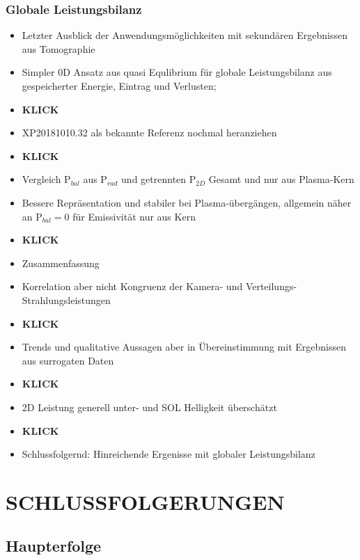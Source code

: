 \documentclass[11pt,a4paper]{article}
\begin{document}
\subsubsection*{Globale Leistungsbilanz}

\begin{itemize}
\item Letzter Ausblick der Anwendungsmöglichkeiten mit sekundären Ergebnissen aus Tomographie
\item Simpler 0D Ansatz aus quasi Equlibrium für globale Leistungsbilanz aus gespeicherter Energie, Eintrag und Verlusten;
\item \textbf{KLICK}
\item XP20181010.32 als bekannte Referenz nochmal heranziehen
\item \textbf{KLICK}
\item Vergleich P$_{bal}$ aus P$_{rad}$ und getrennten P$_{2D}$ Gesamt und nur aus Plasma-Kern
\item Bessere Repräsentation und stabiler bei Plasma-übergängen, allgemein näher an P$_{bal}=0$ für Emissivität nur aus Kern
\item \textbf{KLICK}
\item Zusammenfassung
\item Korrelation aber nicht Kongruenz der Kamera- und Verteilungs-Strahlungsleistungen
\item \textbf{KLICK}
\item Trends und qualitative Aussagen aber in Übereinstimmung mit Ergebnissen aus surrogaten Daten
\item \textbf{KLICK}
\item 2D Leistung generell unter- und SOL Helligkeit überschätzt
\item \textbf{KLICK}
\item Schlussfolgernd: Hinreichende Ergenisse mit globaler Leistungsbilanz
\end{itemize}

\section{SCHLUSSFOLGERUNGEN}

\subsection{Haupterfolge}
\end{document}
